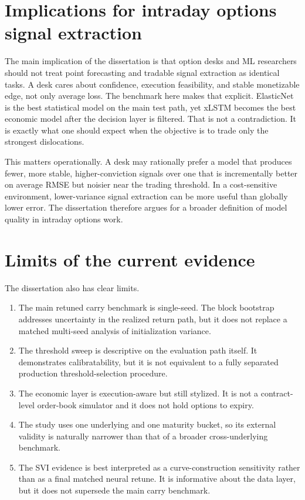 \documentclass[12pt]{report}
\begin{document}
\section{Implications for intraday options signal extraction}
The main implication of the dissertation is that option desks and ML researchers should not treat point forecasting and tradable signal extraction as identical tasks. A desk cares about confidence, execution feasibility, and stable monetizable edge, not only average loss. The benchmark here makes that explicit. ElasticNet is the best statistical model on the main test path, yet xLSTM becomes the best economic model after the decision layer is filtered. That is not a contradiction. It is exactly what one should expect when the objective is to trade only the strongest dislocations.

This matters operationally. A desk may rationally prefer a model that produces fewer, more stable, higher-conviction signals over one that is incrementally better on average RMSE but noisier near the trading threshold. In a cost-sensitive environment, lower-variance signal extraction can be more useful than globally lower error. The dissertation therefore argues for a broader definition of model quality in intraday options work.

\section{Limits of the current evidence}
The dissertation also has clear limits.
\begin{enumerate}[leftmargin=1.3cm]
    \item The main retuned carry benchmark is single-seed. The block bootstrap addresses uncertainty in the realized return path, but it does not replace a matched multi-seed analysis of initialization variance.
    \item The threshold sweep is descriptive on the evaluation path itself. It demonstrates calibratability, but it is not equivalent to a fully separated production threshold-selection procedure.
    \item The economic layer is execution-aware but still stylized. It is not a contract-level order-book simulator and it does not hold options to expiry.
    \item The study uses one underlying and one maturity bucket, so its external validity is naturally narrower than that of a broader cross-underlying benchmark.
    \item The SVI evidence is best interpreted as a curve-construction sensitivity rather than as a final matched neural retune. It is informative about the data layer, but it does not supersede the main carry benchmark.
\end{enumerate}
\end{document}

